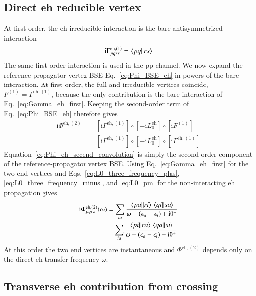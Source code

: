 \documentclass[aip,jcp,reprint,noshowkeys,superscriptaddress]{revtex4-1}
\newcommand{\eps}{\epsilon}
\newcommand{\ii}{\mathrm{i}}
\newcommand{\eh}{\text{eh}}
\newcommand{\pp}{\text{pp}}
\begin{document}
\subsection{Direct eh reducible vertex}

At first order, the $\eh$ irreducible interaction is the bare
antisymmetrized interaction
\begin{equation}
	\ii\Gamma^{\eh,(1)}_{pqrs}
	=
	\mel{pq}{}{rs}
	\label{eq:Gamma_eh_first}
\end{equation}
The same first-order interaction is used in the $\pp$ channel.
We now expand the reference-propagator vertex BSE Eq.~\eqref{eq:Phi_BSE_eh} in powers of
the bare interaction.
At first order, the full and irreducible vertices coincide,
$F^{(1)}=\Gamma^{\eh,(1)}$, because the only contribution is the bare
interaction of Eq.~\eqref{eq:Gamma_eh_first}.
Keeping the second-order term of Eq.~\eqref{eq:Phi_BSE_eh} therefore gives
\begin{equation}
	\begin{aligned}
	\ii\Phi^{\eh,(2)}
	&=
	\left[\ii\Gamma^{\eh,(1)}\right]
	\circ\left[-\ii L_0^\eh\right]
	\circ\left[\ii F^{(1)}\right]
	\\
	&=
	\left[\ii\Gamma^{\eh,(1)}\right]
	\circ\left[-\ii L_0^\eh\right]
	\circ\left[\ii\Gamma^{\eh,(1)}\right]
	\end{aligned}
	\label{eq:Phi_eh_second_convolution}
\end{equation}
Equation~\eqref{eq:Phi_eh_second_convolution}
is simply the second-order component of the reference-propagator vertex BSE.
Using Eq.~\eqref{eq:Gamma_eh_first} for the two end vertices and
Eqs.~\eqref{eq:L0_three_frequency_plus},
\eqref{eq:L0_three_frequency_minus}, and \eqref{eq:L0_pm} for the
non-interacting $\eh$ propagation gives
\begin{equation}
	\begin{split}
	\ii\Phi^{\eh,(2)}_{pqrs}(\omega)
	&=
	\sum_{ia}
	\frac{
	\mel{pa}{}{ri}
	\mel{qi}{}{sa}
	}
	{\omega-(\eps_a-\eps_i)+\ii0^+}
	\\
	&-
	\sum_{ia}
	\frac{
	\mel{pi}{}{ra}
	\mel{qa}{}{si}
	}
	{\omega+(\eps_a-\eps_i)-\ii0^+}
	\end{split}
	\label{eq:Phi_eh_second}
\end{equation}
At this order the two end vertices are instantaneous and
$\Phi^{\eh,(2)}$ depends only on the direct $\eh$ transfer
frequency $\omega$.

\subsection{Transverse eh contribution from crossing}\label{sec:crossing}
\end{document}

